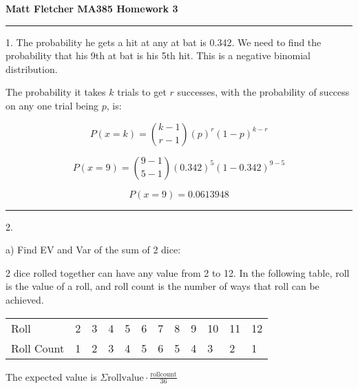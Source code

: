 \documentclass{article}
\begin{document}
	

\thispagestyle{empty}

\let\oldemptyset\emptyset
\let\emptyset\varnothing


\newcommand*{\Perm}[2]{{}^{#1}\!P_{#2}}
\newcommand*{\Comb}[2]{{}^{#1}C_{#2}}


	
\textbf{	Matt Fletcher MA385 Homework 3}
\smallskip

\noindent\rule{8cm}{0.4pt}

1. The probability he gets a hit at any at bat is 0.342. We need to find the probability that his 9th at bat is his 5th hit. This is a negative binomial distribution. 

The probability it takes $k$ trials to get $r$ successes, with the probability of success on any one trial being $p$, is:

\[P(x=k) =  \binom{k-1}{r-1} (p)^r (1-p)^{k-r}\]

\[P(x=9) =  \binom{9-1}{5-1} (0.342)^5 (1-0.342)^{9-5}\]

\[P(x=9) =\boxed{0.0613948} \]






\noindent\rule{8cm}{0.4pt}

2. 

a) Find EV and Var of the sum of 2 dice:

	2 dice rolled together can have any value from 2 to 12. In the following table, roll is the value of a roll, and roll count is the number of ways that roll can be achieved. 


\begin{table}[h]
\begin{tabular}{llllllllllll}
Roll       & 2 & 3 & 4 & 5 & 6 & 7 & 8 & 9 & 10 & 11 & 12 \\
Roll Count & 1 & 2 & 3 & 4 & 5 & 6 & 5 & 4 & 3  & 2  & 1 
\end{tabular}
\end{table}

The expected value is  $\Sigma \text{rollvalue} \cdot \frac{\text{rollcount}}{36}$
\end{document}
